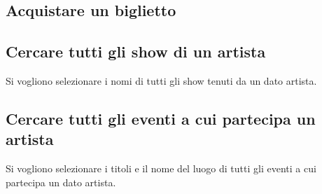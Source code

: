 \documentclass[a4paper,11pt]{article}
\begin{document}
\subsection{Acquistare un biglietto}


\subsection{Cercare tutti gli show di un artista}
Si vogliono selezionare i nomi di tutti gli show tenuti da un dato artista.


\subsection{Cercare tutti gli eventi a cui partecipa un artista}
Si vogliono selezionare i titoli e il nome del luogo di tutti gli eventi a cui
partecipa un dato artista.

\end{document}
